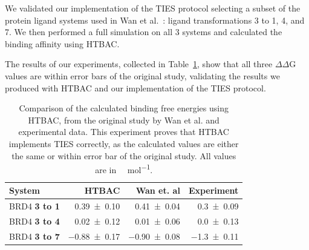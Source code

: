 We validated our implementation of the TIES protocol selecting a subset of
the protein ligand systems used in Wan et al.~\cite{Wan2017brd4}: ligand
transformations 3 to 1, 4, and 7. We then performed a full simulation on all
3 systems and calculated the binding affinity using HTBAC.

The results of our experiments, collected in Table~\ref{tab:exp2}, show that
all three $\Delta \Delta$G values are within error bars of the original
study, validating the results we produced with HTBAC and our implementation
of the TIES protocol.

\begin{table}
  \centering
  \caption{Comparison of the calculated binding free energies using HTBAC,
  from the original study by Wan et al. and experimental data. This
  experiment proves that HTBAC implements TIES correctly, as the calculated
  values are either the same or within error bar of the original study. All
  values are in \si{\kilo\calorie\per\mole}.}  
  \begin{tabular}{lrrr}
    \toprule
    System & HTBAC & Wan et. al & Experiment \\
    \midrule
    BRD4 \textbf{3 to 1} & \num{0.39 +- 0.10} &   \num{0.41 +- 0.04} &  \num{0.3 +- 0.09} \\
    BRD4 \textbf{3 to 4} & \num{0.02 +- 0.12} &   \num{0.01 +- 0.06} &  \num{0.0 +- 0.13} \\
    BRD4 \textbf{3 to 7} & \num{-0.88 +- 0.17} &  \num{-0.90 +- 0.08} & \num{-1.3 +- 0.11} \\
    \bottomrule
  \end{tabular}
  \label{tab:exp2}
\end{table}




